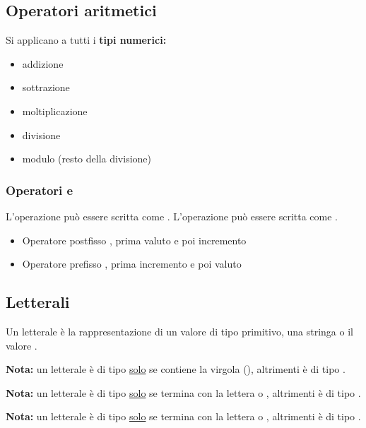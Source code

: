 \documentclass[../main.tex]{subfiles}
\begin{document}
\subsection{Operatori aritmetici}
Si applicano a tutti i \textbf{tipi numerici:}
\begin{itemize}
    \item \code{+} addizione
    \item \code{-} sottrazione
    \item \code{*} moltiplicazione
    \item \code{/} divisione
    \item \code{\%} modulo (resto della divisione)
\end{itemize}

\subsubsection{Operatori \code{++} e \code{--}}
L'operazione  può essere scritta come .
L'operazione  può essere scritta come .

\begin{itemize}
    \item Operatore postfisso , prima valuto  e poi incremento
    \item Operatore prefisso , prima incremento  e poi valuto
\end{itemize}

\vspace{1cm}
\subsection{Letterali}
Un letterale è la rappresentazione di un valore di tipo primitivo, una stringa o il valore .

\textbf{Nota:} un letterale è di tipo  \underline{solo} se contiene la virgola (), altrimenti è di tipo .

\textbf{Nota:} un letterale è di tipo  \underline{solo} se termina con la lettera  o ,
altrimenti è di tipo .

\textbf{Nota:} un letterale è di tipo  \underline{solo} se termina con la lettera  o ,
altrimenti è di tipo .

\vspace{1cm}
\end{document}
